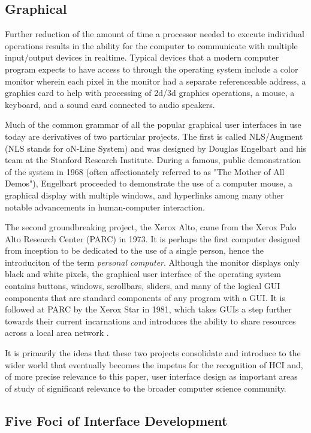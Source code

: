 \subsection{Graphical}

Further reduction of the amount of time a processor needed to execute individual operations results in the ability for the computer to communicate with multiple input/output devices in realtime. Typical devices that a modern computer program expects to have access to through the operating system include a color monitor wherein each pixel in the monitor had a separate referenceable address, a graphics card to help with processing of 2d/3d graphics operations, a mouse, a keyboard, and a sound card connected to audio speakers.

Much of the common grammar of all the popular graphical user interfaces in use today are derivatives of two particular projects. The first is called NLS/Augment (NLS stands for oN-Line System) and was designed by Douglas Engelbart and his team at the Stanford Research Institute. During a famous, public demonstration of the system in 1968 (often affectionately referred to as "The Mother of All Demos"), Engelbart proceeded to demonstrate the use of a computer mouse, a graphical display with multiple windows, and hyperlinks among many other notable advancements in human-computer interaction. 

The second groundbreaking project, the Xerox Alto, came from the Xerox Palo Alto Research Center (PARC) in 1973. It is perhaps the first computer designed from inception to be dedicated to the use of a single person, hence the introduciton of the term \emph{personal computer}. Although the monitor displays only black and white pixels, the graphical user interface of the operating system contains buttons, windows, scrollbars, sliders, and many of the logical GUI components that are standard components of any program with a GUI. It is followed at PARC by the Xerox Star in 1981, which takes GUIs a step further towards their current incarnations and introduces the ability to share resources across a local area network \cite{xeroxstar1989}.

It is primarily the ideas that these two projects consolidate and introduce to the wider world that eventually becomes the impetus for the recognition of HCI and, of more precise relevance to this paper, user interface design as important areas of study of significant relevance to the broader computer science community. 

\subsection{Five Foci of Interface Development}


